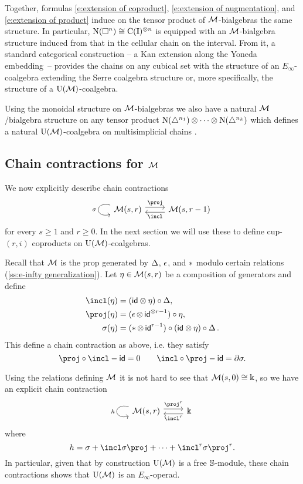 Together, formulas \eqref{e:extension of coproduct}, \eqref{e:extension of augmentation}, and \eqref{e:extension of product} induce on the tensor product of $\mathcal{M}$-bialgebras the same structure.
In particular, $\operatorname{N}(\square^n) \cong \operatorname{C}(\mathbb{I})^{\otimes n}$ is equipped with an $\mathcal{M}$-bialgebra structure induced from that in the cellular chain on the interval.
From it, a standard categorical construction -- a Kan extension along the Yoneda embedding~-- provides the chains on any cubical set with the structure of an $E_\infty$-coalgebra extending the Serre coalgebra structure or, more specifically, the structure of a ${\operatorname{U}(\mathcal{M})}$-coalgebra.

Using the monoidal structure on $\mathcal{M}$-bialgebras we also have a natural $\mathcal{M}$\-/bialgebra structure on any tensor product $\operatorname{N}(\triangle^{n_1}) \otimes \dots \otimes \operatorname{N}(\triangle^{n_k})$ which defines a natural ${\operatorname{U}(\mathcal{M})}$-coalgebra on multisimplicial chains \cite{?}.

\subsection{Chain contractions for $\mathcal{M}$} \label{ss:homology of M}

We now explicitly describe chain contractions
\[
\begin{tikzcd}
\arrow[loop, distance=2em, in=195, out=165, "\sigma"'] \M(s,r) \arrow[r, shift left=3pt, "\proj"] &
\M(s,r-1) \arrow[l, shift left=3pt, "\incl"]
\end{tikzcd}
\]
for every $s \geq 1$ and $r \geq 0$.
In the next section we will use these to define cup-$(r, i)$ coproducts on ${\operatorname{U}(\mathcal{M})}$-coalgebras.

Recall that $\mathcal{M}$ is the prop generated by $\operatorname{\Delta}$, $\operatorname{\epsilon}$, and $\operatorname{\ast}$ modulo certain relations (\cref{ss:e-infty generalization}).
Let $\eta \in \mathcal{M}(s,r)$ be a composition of generators and define
\begin{align*}
\incl(\eta) & = (\id \ot \eta) \circ \copr, \\
\proj(\eta) & = (\aug \ot \, \id^{\ot r-1}) \circ \eta, \\
\sigma(\eta) & = (\pr \ot \, \id^{r-1}) \circ (\id \otimes \eta) \circ \copr.
\end{align*}
This define a chain contraction as above, i.e. they satisfy
\[
\proj \circ \incl - \id = 0
\qquad
\incl \circ \proj - \id = \bd \sigma.
\]

Using the relations defining $\mathcal{M}$ it is not hard to see that $\mathcal{M}(s,0) \cong \Bbbk$, so we have an explicit chain contraction
\[
\begin{tikzcd}
\arrow[loop, distance=2em, in=195, out=165, "h"'] \M(s,r) \arrow[r, shift left=3pt, "\proj^r"] &
\k \arrow[l, shift left=3pt, "\incl^r"]
\end{tikzcd}
\]
where
\begin{equation} \label{e:big chain contraction}
h = \sigma + \incl \sigma \proj + \dots + \incl^{r} \sigma \proj^{r}.
\end{equation}
In particular, given that by construction ${\operatorname{U}(\mathcal{M})}$ is a free $\mathbb{S}$-module, these chain contractions shows that ${\operatorname{U}(\mathcal{M})}$ is an $E_\infty$-operad.

